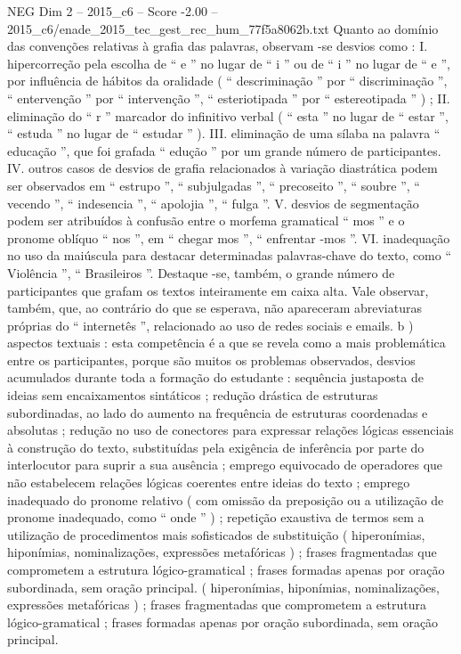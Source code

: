 \begin{textsample}{NEG Dim 2 – 2015\_c6 – Score -2.00 – 2015\_c6/enade\_2015\_tec\_gest\_rec\_hum\_77f5a8062b.txt}
Quanto ao domínio das convenções relativas à grafia das palavras, observam -se desvios como : I. hipercorreção pela escolha de “ e ” no lugar de “ i ” ou de “ i ” no lugar de “ e ”, por influência de hábitos da oralidade ( “ descriminação ” por “ discriminação ”, “ entervenção ” por “ intervenção ”, “ esteriotipada ” por “ estereotipada ” ) ; II. eliminação do “ r ” marcador do infinitivo verbal ( “ esta ” no lugar de “ estar ”, “ estuda ” no lugar de “ estudar ” ).
III. eliminação de uma sílaba na palavra “ educação ”, que foi grafada “ edução ” por um grande número de participantes.
IV. outros casos de desvios de grafia relacionados à variação diastrática podem ser observados em “ estrupo ”, “ subjulgadas ”, “ precoseito ”, “ soubre ”, “ vecendo ”, “ indesencia ”, “ apolojia ”, “ fulga ”.
V. desvios de segmentação podem ser atribuídos à confusão entre o morfema gramatical “ mos ” e o pronome oblíquo “ nos ”, em “ chegar mos ”, “ enfrentar -mos ”.
VI. inadequação no uso da maiúscula para destacar determinadas palavras-chave do texto, como “ Violência ”, “ Brasileiros ”.
Destaque -se, também, o grande número de participantes que grafam os textos inteiramente em caixa alta.
Vale observar, também, que, ao contrário do que se esperava, não apareceram abreviaturas próprias do “ internetês ”, relacionado ao uso de redes sociais e emails. b ) aspectos textuais : esta competência é a que se revela como a mais problemática entre os participantes, porque são muitos os problemas observados, desvios acumulados durante toda a formação do estudante : sequência justaposta de ideias sem encaixamentos sintáticos ; redução drástica de estruturas subordinadas, ao lado do aumento na frequência de estruturas coordenadas e absolutas ; redução no uso de conectores para expressar relações lógicas essenciais à construção do texto, substituídas pela exigência de inferência por parte do interlocutor para suprir a sua ausência ; emprego equivocado de operadores que não estabelecem relações lógicas coerentes entre ideias do texto ; emprego inadequado do pronome relativo ( com omissão da preposição ou a utilização de pronome inadequado, como “ onde ” ) ; repetição exaustiva de termos sem a utilização de procedimentos mais sofisticados de substituição ( hiperonímias, hiponímias, nominalizações, expressões metafóricas ) ; frases fragmentadas que comprometem a estrutura lógico-gramatical ; frases formadas apenas por oração subordinada, sem oração principal. ( hiperonímias, hiponímias, nominalizações, expressões metafóricas ) ; frases fragmentadas que comprometem a estrutura lógico-gramatical ; frases formadas apenas por oração subordinada, sem oração principal.

\end{textsample}
